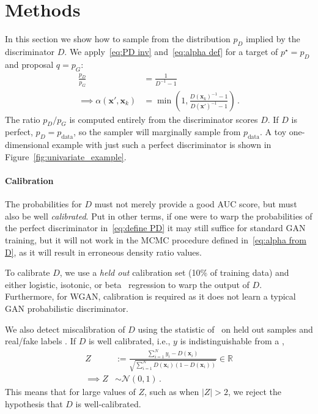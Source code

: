 \documentclass{article}
\renewcommand{\vec}[1]{{\boldsymbol{\mathbf{#1}}}} %
\newcommand{\R}{\mathbb{R}}
\newcommand{\sample}{\sim}
\newcommand{\norm}{\mathcal{N}}
\newcommand{\bern}{\textrm{Bern}}
\newcommand{\target}{{p^\star}}
\newcommand{\prop}{q}
\newcommand{\PG}{{p_G}}
\newcommand{\PD}{{p_D}}
\newcommand{\PR}{{p_{\textrm{data}}}}
\newcommand{\accept}{\alpha}
\begin{document}


\section{Methods}
\label{sec:Methods}

In this section we show how to sample from the distribution $\PD$ implied by the discriminator $D$.
We apply~\eqref{eq:PD inv} and~\eqref{eq:alpha def} for a target of $\target=\PD$ and proposal $\prop=\PG$:
\begin{align}
  \frac{\PD}{\PG} &= \frac{1}{D^{-1} - 1} \\
  \implies
  \accept(\vec x', \vec x_k) &= \min\left(1, \frac{D(\vec x_k)^{-1} - 1}{D(\vec x')^{-1} - 1}\right)\,. \label{eq:alpha from D}
\end{align}
The ratio $\PD/\PG$ is computed entirely from the discriminator scores $D$.
If $D$ is perfect, $\PD = \PR$, so the sampler will marginally sample from $\PR$.
A toy one-dimensional example with just such a perfect discriminator is shown in Figure~\ref{fig:univariate_example}.

\paragraph{Calibration}
The probabilities for $D$ must not merely provide a good AUC score, but must also be well \emph{calibrated}.
Put in other terms, if one were to warp the probabilities of the perfect discriminator in~\eqref{eq:define PD} it may still suffice for standard GAN training, but it will not work in the MCMC procedure defined in~\eqref{eq:alpha from D}, as it will result in erroneous density ratio values.

To calibrate $D$, we use a \emph{held out} calibration set (10\% of training data) and either logistic, isotonic, or beta~\citep{Kull2017} regression to warp the output of $D$.
Furthermore, for WGAN, calibration is required as it does not learn a typical GAN probabilistic discriminator.

We also detect miscalibration of $D$ using the statistic of~\citet{Dawid1997} on held out samples \smash{$\vec x_{1:N}$} and real/fake labels .
If $D$ is well calibrated, i.e., $y$ is indistinguishable from a \smash{$y \sample \bern(D(\vec x))$},
\begin{align}
  Z &:= \frac{\sum_{i=1}^N y_i - D(\vec x_i)}{\sqrt{\sum_{i=1}^N D(\vec x_i) (1 - D(\vec x_i))}} \in \R \label{eq:calib score} \\
  \implies Z &\sample \norm(0,1)\,.
\end{align}
This means that for large values of $Z$, such as when $|Z| > 2$, we reject the hypothesis that $D$ is well-calibrated.
\end{document}
